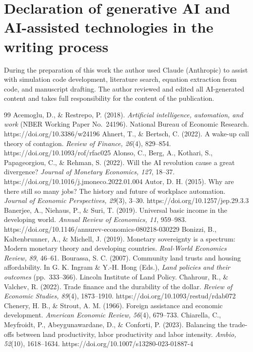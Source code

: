 \documentclass[preprint,review,12pt]{elsarticle}
\begin{document}
\section*{Declaration of generative AI and AI-assisted technologies in the writing process} During the preparation of this work the author used Claude (Anthropic) to assist with simulation code development, literature search, equation extraction from code, and manuscript drafting. The author reviewed and edited all AI-generated content and takes full responsibility for the content of the publication.
\begin{thebibliography}{99} 
 Acemoglu, D., \& Restrepo, P. (2018). \emph{Artificial intelligence, automation, and work} (NBER Working Paper No.~24196). National Bureau of Economic Research. https://doi.org/10.3386/w24196 
 Ahnert, T., \& Bertsch, C. (2022). A wake-up call theory of contagion. \emph{Review of Finance, 26}(4), 829--854. https://doi.org/10.1093/rof/rfac025 
 Alonso, C., Berg, A., Kothari, S., Papageorgiou, C., \& Rehman, S. (2022). Will the AI revolution cause a great divergence? \emph{Journal of Monetary Economics, 127}, 18--37. https://doi.org/10.1016/j.jmoneco.2022.01.004 
 Autor, D. H. (2015). Why are there still so many jobs? The history and future of workplace automation. \emph{Journal of Economic Perspectives, 29}(3), 3--30. https://doi.org/10.1257/jep.29.3.3 
 Banerjee, A., Niehaus, P., \& Suri, T. (2019). Universal basic income in the developing world. \emph{Annual Review of Economics, 11}, 959--983. https://doi.org/10.1146/annurev-economics-080218-030229 
 Bonizzi, B., Kaltenbrunner, A., \& Michell, J. (2019). Monetary sovereignty is a spectrum: Modern monetary theory and developing countries. \emph{Real-World Economics Review, 89}, 46--61. 
 Bourassa, S. C. (2007). Community land trusts and housing affordability. In G. K. Ingram \& Y.-H. Hong (Eds.), \emph{Land policies and their outcomes} (pp.~333--366). Lincoln Institute of Land Policy. 
 Chahrour, R., \& Valchev, R. (2022). Trade finance and the durability of the dollar. \emph{Review of Economic Studies, 89}(4), 1873--1910. https://doi.org/10.1093/restud/rdab072 
 Chenery, H. B., \& Strout, A. M. (1966). Foreign assistance and economic development. \emph{American Economic Review, 56}(4), 679--733. 
 Chiarella, C., Meyfroidt, P., Abeygunawardane, D., \& Conforti, P. (2023). Balancing the trade-offs between land productivity, labor productivity and labor intensity. \emph{Ambio, 52}(10), 1618--1634. https://doi.org/10.1007/s13280-023-01887-4 

\end{thebibliography}
\end{document}
